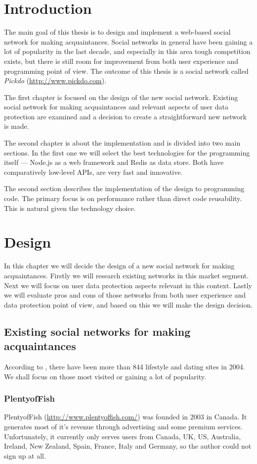 \documentclass[12pt,oneside]{fithesis}
\begin{document}
\MainMatter
\tableofcontents
\chapter*{Introduction}
	The main goal of this thesis is to design and implement a web-based social network for making acquaintances. Social networks in general have been gaining a lot of popularity in the last decade, and especially in this area tough competition exists, but there is still room for improvement from both user experience and programming point of view. The outcome of this thesis is a social network called \emph{Pickdo} (\url{http://www.pickdo.com}).
	
	The first chapter is focused on the design of the new social network. Existing social network for making acquaintances  and relevant aspects of user data protection are examined and a decision to create a straightforward new network is made.
	
	The second chapter is about the implementation and is divided into two main sections. In the first one we will select the best technologies for the programming itself --- Node.js as a web framework and Redis as data store. Both have comparatively low-level APIs, are very fast and innovative.
	
	The second section describes the implementation of the design to programming code. The primary focus is on performance rather than direct code reusability. This is natural given the technology choice. 
\chapter{Design}
	In this chapter we will decide the design of a new social network for making acquaintances. Firstly we will research existing networks in this market segment. Next we will focus on user data protection aspects relevant in this context. Lastly we will evaluate pros and cons of those networks from both user experience and data protection point of view, and  based on this we will make the design decision. 
\section{Existing social networks for making acquaintances}
	According to \cite{wiki:od}, there have been more than 844 lifestyle and dating sites in 2004. We shall focus on those most visited or gaining a lot of popularity.
	\subsection{PlentyofFish}
		PlentyofFish (\url{http://www.plentyoffish.com/}) was founded in 2003 in Canada. It generates most of it's revenue through advertising and some premium services. Unfortunately, it currently only serves users from Canada, UK, US, Australia, Ireland, New Zealand, Spain, France, Italy and Germany, so the author could not sign up at all.
		
\end{document}
